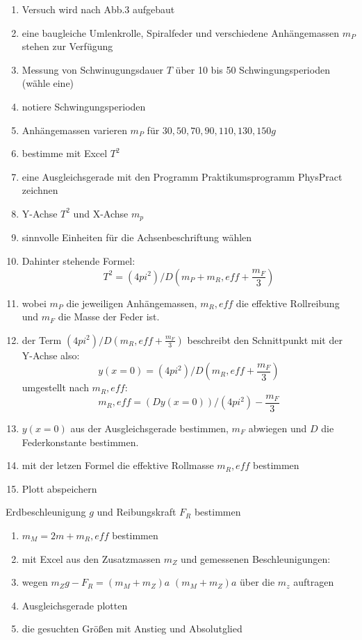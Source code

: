 \documentclass{protokoll}
\begin{document}
\begin{enumerate}
\item Versuch wird nach Abb.3 aufgebaut
\item eine baugleiche Umlenkrolle, Spiralfeder und verschiedene Anhängemassen $m_P$
stehen zur Verfügung
\item Messung von Schwinugungsdauer $T$ über 10 bis 50 Schwingungsperioden (wähle eine)
\item notiere Schwingungsperioden
\item Anhängemassen varieren $m_P$ für $30, 50, 70, 90, 110, 130, 150g$
\item bestimme mit Excel $T^2$
\item eine Ausgleichsgerade mit den Programm Praktikumsprogramm PhysPract zeichnen
\item Y-Achse $T^2$ und X-Achse $m_p$
\item sinnvolle Einheiten für die Achsenbeschriftung wählen
\item Dahinter stehende Formel:
\begin{equation}
 T^2 = (4pi^2)/D(m_P + m_R,eff + \frac{m_F}{3}) 
\end{equation}
\item wobei $m_P$ die jeweiligen Anhängemassen, $m_R,eff$ die effektive Rollreibung und $m_F$ die Masse der Feder ist.
\item der Term $(4pi^2)/D (m_R,eff + \frac{m_F}{3})$ beschreibt den Schnittpunkt mit der Y-Achse also:
\begin{equation}
 y(x=0) = (4pi^2)/D (m_R,eff + \frac{m_F}{3})
\end{equation}
umgestellt nach $m_R,eff$:
\begin{equation}
 m_R,eff = (D y(x=0))/(4pi^2) - \frac{m_F}{3} 
\end{equation}
\item $y(x=0)$ aus der Ausgleichsgerade bestimmen, $m_F$ abwiegen und $D$ die Federkonstante bestimmen.
\item mit der letzen Formel die effektive Rollmasse $m_R,eff$ bestimmen
\item Plott abspeichern 
\end{enumerate}

Erdbeschleunigung $g$ und Reibungskraft $F_R$ bestimmen

\begin{enumerate}
\item $m_M = 2m + m_R,eff$ bestimmen
\item mit Excel aus den Zusatzmassen $m_Z$ und gemessenen Beschleunigungen:
\item wegen $m_Zg - F_R = (m_M + m_Z)a$ $(m_M + m_Z)a$ über die $m_z$ auftragen
\item Ausgleichsgerade plotten
\item die gesuchten Größen mit Anstieg und Absolutglied
\end{enumerate}
\end{document}
